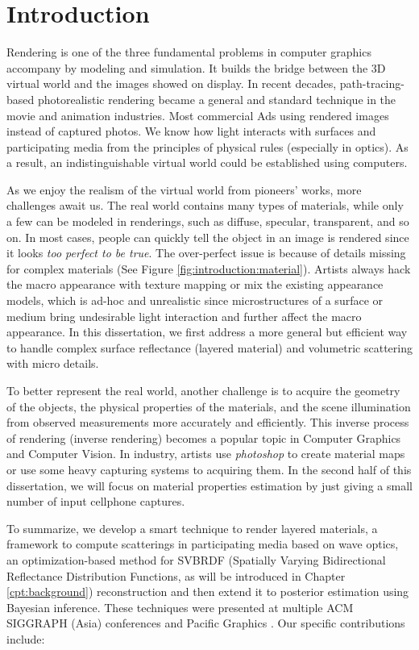 \chapter{Introduction}
\label{cpt:introduction}

Rendering is one of the three fundamental problems in computer graphics accompany by modeling and simulation. It builds the bridge between the 3D virtual world and the images showed on display. In recent decades, path-tracing-based photorealistic rendering became a general and standard technique in the movie and animation industries. Most commercial Ads using rendered images instead of captured photos. We know how light interacts with surfaces and participating media from the principles of physical rules (especially in optics). As a result, an indistinguishable virtual world could be established using computers.  

As we enjoy the realism of the virtual world from pioneers' works, more challenges await us. The real world contains many types of materials, while only a few can be modeled in renderings, such as diffuse, specular, transparent, and so on. In most cases, people can quickly tell the object in an image is rendered since it looks \emph{too perfect to be true}. The over-perfect issue is because of details missing for complex materials (See Figure \ref{fig:introduction:material}). Artists always hack the macro appearance with texture mapping or mix the existing appearance models, which is ad-hoc and unrealistic since microstructures of a surface or medium bring undesirable light interaction and further affect the macro appearance. In this dissertation, we first address a more general but efficient way to handle complex surface reflectance (layered material) and volumetric scattering with micro details.



To better represent the real world, another challenge is to acquire the geometry of the objects, the physical properties of the materials, and the scene illumination from observed measurements more accurately and efficiently. This inverse process of rendering (inverse rendering) becomes a popular topic in Computer Graphics and Computer Vision. In industry, artists use \emph{photoshop} to create material maps or use some heavy capturing systems to acquiring them. In the second half of this dissertation, we will focus on material properties estimation by just giving a small number of input cellphone captures.

To summarize, we develop a smart technique to render layered materials, a framework to compute scatterings in participating media based on wave optics, an optimization-based method for SVBRDF (Spatially Varying Bidirectional Reflectance Distribution Functions,
as will be introduced in Chapter \ref{cpt:background}) reconstruction and then extend it to posterior estimation using Bayesian inference.
These techniques were presented at multiple ACM SIGGRAPH (Asia) conferences \cite{guo2018position, guo2021beyond, guo2020materialgan} and Pacific Graphics \cite{guo2020bayesian}. Our specific contributions include:

